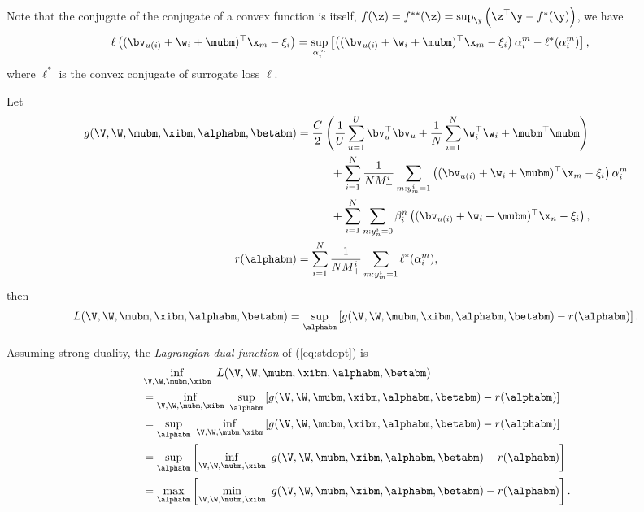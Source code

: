 Note that the conjugate of the conjugate of a convex function is itself, \ie $f(\z) = f^{**}(\z) = \sup_\y \left(\z^\top \y - f^*(\y) \right)$, we have
\begin{equation*}
\begin{aligned}
\ell \left( (\bv_{u(i)} + \w_i + \mubm)^\top \x_m - \xi_i \right)
&= \sup_{\alpha_i^m} \left[ \left( (\bv_{u(i)} + \w_i + \mubm)^\top \x_m - \xi_i \right) \alpha_i^m - \ell^*(\alpha_i^m) \right],
\end{aligned}
\end{equation*}
where $\ell^*$ is the convex conjugate of surrogate loss $\ell$.

Let
\begin{equation*}
\begin{aligned}
g(\V, \W, \mubm, \xibm, \alphabm, \betabm)
&= \frac{C}{2} \left( \frac{1}{U} \sum_{u=1}^U \bv_u^\top \bv_u 
     + \frac{1}{N} \sum_{i=1}^N \w_i^\top \w_i + \mubm^\top \mubm \right) \\
& \hspace{3em}
     + \sum_{i=1}^N \frac{1}{N M_+^i} \sum_{m: y_m^i = 1} \left( (\bv_{u(i)} + \w_i + \mubm)^\top \x_m - \xi_i \right) \alpha_i^m \\
& \hspace{3em}
     + \sum_{i=1}^N \sum_{n: y_n^i = 0} \beta_i^n \left( (\bv_{u(i)} + \w_i + \mubm)^\top \x_n - \xi_i \right), \\
r(\alphabm)
&= \sum_{i=1}^N \frac{1}{N M_+^i} \sum_{m: y_m^i = 1} \ell^*(\alpha_i^m),
\end{aligned}
\end{equation*}
then 
\begin{equation*}
\begin{aligned}
L(\V, \W, \mubm, \xibm, \alphabm, \betabm) 
= \sup_\alphabm \left[ g(\V, \W, \mubm, \xibm, \alphabm, \betabm) - r(\alphabm) \right].
\end{aligned}
\end{equation*}

Assuming strong duality, the \emph{Lagrangian dual function} of (\ref{eq:stdopt}) is
\begin{equation}
\label{eq:dualfunc}
\begin{aligned}
&\inf_{\V, \W, \mubm, \xibm} \ L(\V, \W, \mubm, \xibm, \alphabm, \betabm) \\
&= \inf_{\V, \W, \mubm, \xibm} \ \sup_\alphabm \left[ g(\V, \W, \mubm, \xibm, \alphabm, \betabm) - r(\alphabm) \right] \\
&= \sup_\alphabm \ \inf_{\V, \W, \mubm, \xibm} \left[ g(\V, \W, \mubm, \xibm, \alphabm, \betabm) - r(\alphabm) \right] \\
&= \sup_\alphabm \left[ \inf_{\V, \W, \mubm, \xibm} \ g(\V, \W, \mubm, \xibm, \alphabm, \betabm) - r(\alphabm) \right] \\
&= \max_\alphabm \left[ \min_{\V, \W, \mubm, \xibm} \ g(\V, \W, \mubm, \xibm, \alphabm, \betabm) - r(\alphabm) \right].
\end{aligned}
\end{equation}

